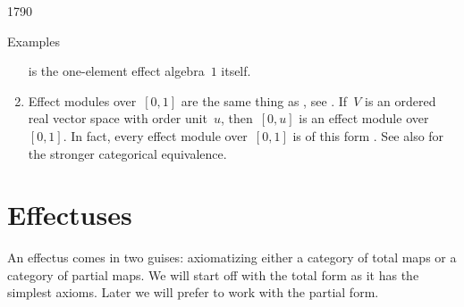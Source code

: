 \begin{parsec}{1790}
\begin{point}{30}{Examples}
\begin{enumerate}
    is the one-element effect algebra~$1$ itself.
\item
Effect modules over~$[0,1]$
    are the same thing as
        ,
        see \cite{gudder1998representation,gudder1999convex}.
If~$V$ is an ordered real vector space with order unit~$u$,
        then~$[0,u]$ is an effect module over~$[0,1]$.
In fact, every effect module over~$[0,1]$
    is of this form \cite{gudder1998representation}.
See also \cite[thm.~3]{jacobs2016expectation}
    for the stronger categorical equivalence.
\end{enumerate}
\spacingfix{}
\end{point}
\end{parsec}

\section{Effectuses}
An effectus comes in two guises:
    axiomatizing either a category of total maps
    or a category of partial maps.
We will start off with the total form as it has the simplest axioms.
Later we will prefer to work with the partial form.

